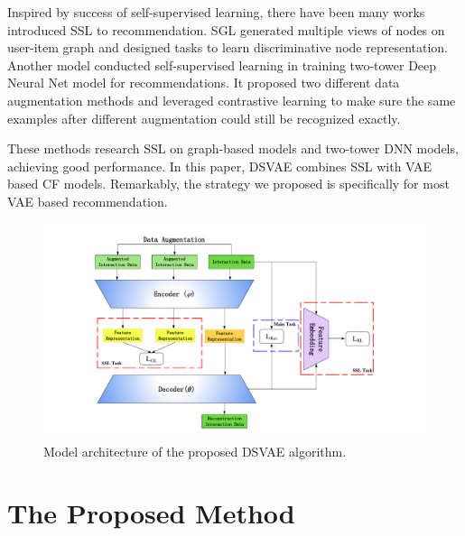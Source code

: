 Inspired by success of self-supervised learning, there have been many works introduced SSL to recommendation. SGL \cite{DBLP:conf/sigir/WuWF0CLX21} generated multiple views of nodes on user-item graph and designed tasks to learn discriminative node representation. Another model \cite{DBLP:journals/corr/abs-2007-12865} conducted self-supervised learning in training two-tower Deep Neural Net model for recommendations. It proposed two different data augmentation methods and leveraged contrastive learning to make sure the same examples after different augmentation could still be recognized exactly.

These methods research SSL on graph-based models and two-tower DNN models, achieving good performance. In this paper, DSVAE combines SSL with VAE based CF models. Remarkably, the strategy we proposed is specifically for most VAE based recommendation.

\begin{figure}[htbp]
 \centerline{\includegraphics[width=1.2\textwidth]{fig/framework_v1.pdf}}
 \caption{ Model architecture of the proposed DSVAE algorithm.}
 \label{framework}
\end{figure}

\section{The Proposed Method}\label{sec3}


